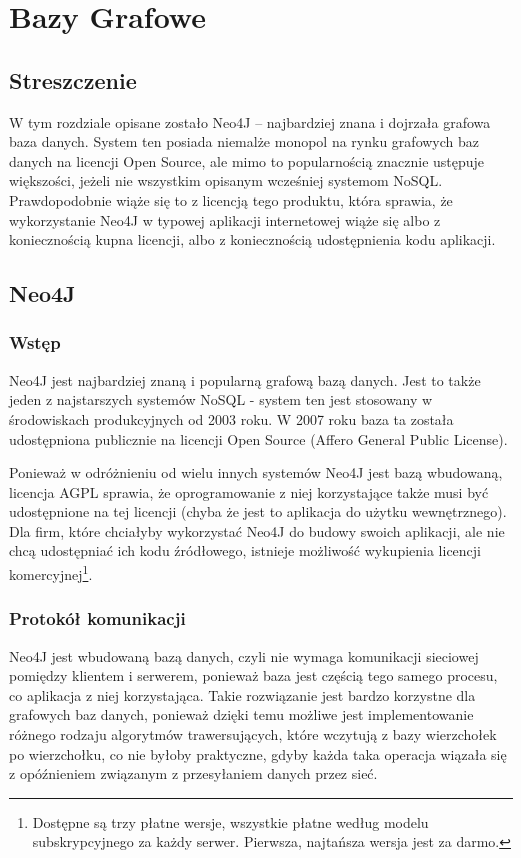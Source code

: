 \chapter{Bazy Grafowe}

\section*{Streszczenie}
W tym rozdziale opisane zostało Neo4J -- najbardziej znana i dojrzała grafowa baza danych.
System ten posiada niemalże monopol na rynku grafowych baz danych na licencji Open Source, ale mimo to popularnością znacznie ustępuje większości, jeżeli nie wszystkim opisanym wcześniej systemom NoSQL.
Prawdopodobnie wiąże się to z licencją tego produktu, która sprawia, że wykorzystanie Neo4J w typowej aplikacji internetowej wiąże się albo z koniecznością kupna licencji, albo z koniecznością udostępnienia kodu aplikacji.

\section{Neo4J}
\label{sec:neo4j}

\subsection*{Wstęp}

Neo4J jest najbardziej znaną i popularną grafową bazą danych.
Jest to także jeden z najstarszych systemów NoSQL - system ten jest stosowany w środowiskach produkcyjnych od 2003 roku.
W 2007 roku baza ta została udostępniona publicznie na licencji Open Source (Affero General Public License).

Ponieważ w odróżnieniu od wielu innych systemów Neo4J jest bazą wbudowaną, licencja AGPL sprawia, że oprogramowanie z niej korzystające także musi być udostępnione na tej licencji (chyba że jest to aplikacja do użytku wewnętrznego).
Dla firm, które chciałyby wykorzystać Neo4J do budowy swoich aplikacji, ale nie chcą udostępniać ich kodu źródłowego, istnieje możliwość wykupienia licencji komercyjnej\footnote{Dostępne są trzy płatne wersje, wszystkie płatne według modelu subskrypcyjnego za każdy serwer. Pierwsza, najtańsza wersja jest za darmo.}.

\subsection*{Protokół komunikacji}

Neo4J jest wbudowaną bazą danych, czyli nie wymaga komunikacji sieciowej pomiędzy klientem i serwerem, ponieważ baza jest częścią tego samego procesu, co aplikacja z niej korzystająca.
Takie rozwiązanie jest bardzo korzystne dla grafowych baz danych, ponieważ dzięki temu możliwe jest implementowanie różnego rodzaju algorytmów trawersujących, które wczytują z bazy wierzchołek po wierzchołku, co nie byłoby praktyczne, gdyby każda taka operacja wiązała się z opóźnieniem związanym z przesyłaniem danych przez sieć.

